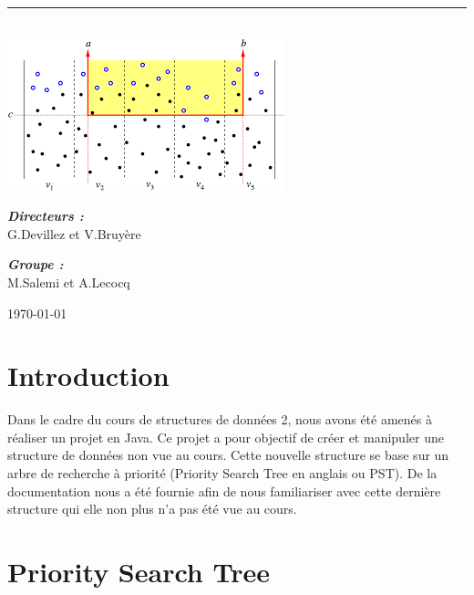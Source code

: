 \documentclass[10pt,a4paper]{article}
\newcommand{\HRule}{\rule{\linewidth}{0.5mm}}
\begin{document}
\begin{titlepage}
\begin{sffamily}
\begin{center}
    \HRule \\[2cm]
    \includegraphics[scale=0.50]{images/window.png}
    \\[2cm]

    \begin{minipage}{0.4\textwidth}
      \begin{flushleft} \large
        \emph{\textbf{Directeurs :}}\\ G.Devillez et V.Bruyère\\
      \end{flushleft}
    \end{minipage}
    \begin{minipage}{0.4\textwidth}
      \begin{flushright} \large
        \emph{\textbf{Groupe :}}\\ M.Salemi et A.Lecocq
      \end{flushright}
    \end{minipage}

    \vfill

    {\large \today}

  \end{center}
  \end{sffamily}
\end{titlepage}

\newpage
\tableofcontents
\newpage
\section{Introduction}
Dans le cadre du cours de structures de données 2, nous avons été amenés à réaliser un projet en Java. Ce projet a pour objectif de créer et manipuler une structure de données non vue au cours. Cette nouvelle structure se base sur un arbre de recherche à priorité (Priority Search Tree en anglais ou PST). De la documentation nous a été fournie afin de nous familiariser avec cette dernière structure qui elle non plus n'a pas été vue au cours.

\section{Priority Search Tree}
\end{document}
